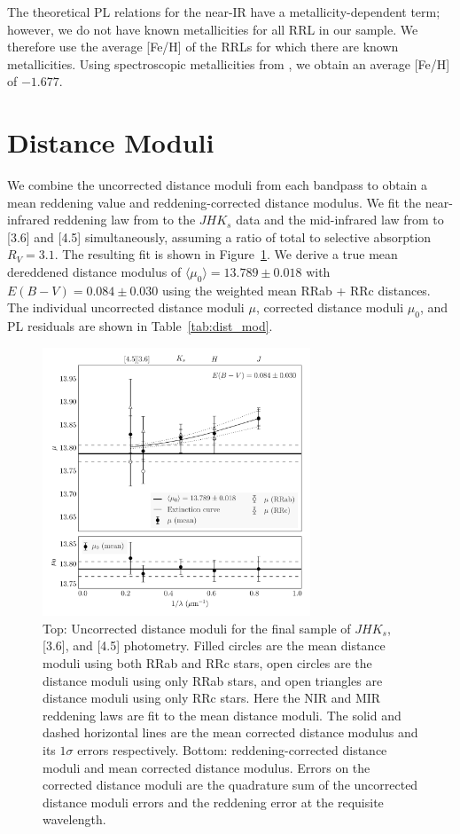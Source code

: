 \documentclass[a4paper,fleqn,usenatbib]{mnras}
\begin{document}
The theoretical PL relations for the near-IR have a metallicity-dependent term; however, we do not have known metallicities for all RRL in our sample. We therefore use the average [Fe/H] of the RRLs for which there are known metallicities. Using spectroscopic metallicities from \citet{2006ApJ...640L..43S}, we obtain an average [Fe/H] of $-1.677$.

\section{Distance Moduli}
\label{sec:distance_moduli}

We combine the uncorrected distance moduli from each bandpass to obtain a mean reddening value and reddening-corrected distance modulus. We fit the near-infrared reddening law from \citet{1989ApJ...345..245C} to the $JHK_s$ data and the mid-infrared law from \citet{2005ApJ...619..931I} to [3.6] and [4.5] simultaneously, assuming a ratio of total to selective absorption $R_V = 3.1$. The resulting fit is shown in Figure~\ref{fig:omegaCen_dist_m4_mean}. We derive a true mean dereddened distance modulus of $\langle \mu_0 \rangle = 13.789 \pm 0.018$ with $E(B-V) = 0.084 \pm 0.030$ using the weighted mean RRab + RRc distances. The individual uncorrected distance moduli $\mu$, corrected distance moduli $\mu_0$, and PL residuals are shown in Table~\ref{tab:dist_mod}.

\begin{figure}
\begin{center}
\includegraphics[width=80mm, trim=0.75cm 0 0.5cm 0]{reworked_fitting_code/final_plots/multiwavelength_distance_m4_clipped_mean.pdf}
\caption{Top: Uncorrected distance moduli for the final sample of $J\!H\!K_s$, [3.6], and [4.5] photometry. Filled circles are the mean distance moduli using both RRab and RRc stars, open circles are the distance moduli using only RRab stars, and open triangles are distance moduli using only RRc stars. Here the NIR and MIR reddening laws are fit to the mean distance moduli. The solid and dashed horizontal lines are the mean corrected distance modulus and its $1\sigma$ errors respectively. Bottom: reddening-corrected distance moduli and mean corrected distance modulus. Errors on the corrected distance moduli are the quadrature sum of the uncorrected distance moduli errors and the reddening error at the requisite wavelength.}
\label{fig:omegaCen_dist_m4_mean}
\end{center}
\end{figure}
\end{document}
